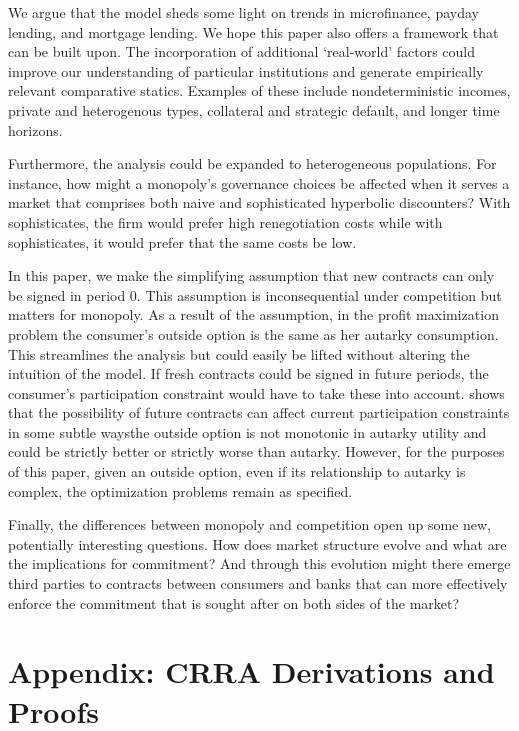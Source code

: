 \documentclass[11pt,english]{article}
\theoremstyle{plain}
\theoremstyle{definition}
\begin{document}
We argue that the model sheds some light on trends in microfinance,
payday lending, and mortgage lending. We hope this paper also offers
a framework that can be built upon. The incorporation of additional
`real-world' factors could improve our understanding of particular
institutions and generate empirically relevant comparative statics.
Examples of these include nondeterministic incomes, private and heterogenous
types, collateral and strategic default, and longer time horizons.

Furthermore, the analysis could be expanded to heterogeneous populations.
For instance, how might a monopoly's governance choices be affected
when it serves a market that comprises both naive and sophisticated
hyperbolic discounters? With sophisticates, the firm would prefer
high renegotiation costs while with sophisticates, it would prefer
that the same costs be low.

In this paper, we make the simplifying assumption that new contracts
can only be signed in period 0. This assumption is inconsequential
under competition but matters for monopoly. As a result of the assumption,
in the profit maximization problem the consumer\textquoteright s outside
option is the same as her autarky consumption. This streamlines the
analysis but could easily be lifted without altering the intuition
of the model. If fresh contracts could be signed in future periods,
the consumer\textquoteright s participation constraint would have
to take these into account. \citet{basu2020} shows that the possibility
of future contracts can affect current participation constraints in
some subtle ways\textemdash the outside option is not monotonic in
autarky utility and could be strictly better or strictly worse than
autarky. However, for the purposes of this paper, given an outside
option, even if its relationship to autarky is complex, the optimization
problems remain as specified.

Finally, the differences between monopoly and competition open up
some new, potentially interesting questions. How does market structure
evolve and what are the implications for commitment? And through this
evolution might there emerge third parties to contracts between consumers
and banks that can more effectively enforce the commitment that is
sought after on both sides of the market?

\appendix

\section{Appendix: CRRA Derivations and Proofs}
\end{document}
